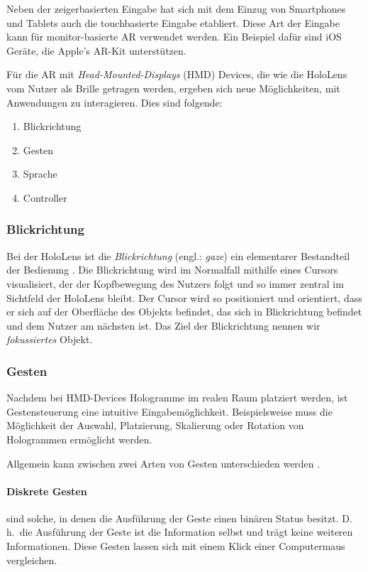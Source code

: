 Neben der zeigerbasierten Eingabe hat sich mit dem Einzug von Smartphones und Tablets auch die touchbasierte Eingabe etabliert. Diese Art der Eingabe kann für monitor-basierte AR verwendet werden. Ein Beispiel dafür sind iOS Geräte, die Apple's AR-Kit unterstützen.

Für die AR mit \textit{Head-Mounted-Displays} (HMD) Devices, die wie die HoloLens vom Nutzer als Brille getragen werden, ergeben sich neue Möglichkeiten, mit Anwendungen zu interagieren. Dies sind folgende:

\begin{enumerate}
  \item Blickrichtung
  \item Gesten
  \item Sprache
  \item Controller
\end{enumerate}

\subsubsection*{Blickrichtung}
Bei der HoloLens ist die \textit{Blickrichtung} (engl.: \textit{gaze}) ein elementarer Bestandteil der Bedienung \cite{windows2017interaction}. Die Blickrichtung wird im Normalfall mithilfe eines Cursors visualisiert, der der Kopfbewegung des Nutzers folgt und so immer zentral im Sichtfeld der HoloLens bleibt. Der Cursor wird so positioniert und orientiert, dass er sich auf der Oberfläche des Objekts befindet, das sich in Blickrichtung befindet und dem Nutzer am nächsten ist. Das Ziel der Blickrichtung nennen wir \textit{fokussiertes} Objekt.

\subsubsection*{Gesten}
Nachdem bei HMD-Devices Hologramme im realen Raum platziert werden, ist Gestensteuerung eine intuitive Eingabemöglichkeit. Beispielsweise muss die Möglichkeit der Auswahl, Platzierung, Skalierung oder Rotation von Hologrammen ermöglicht werden.

Allgemein kann zwischen zwei Arten von Gesten unterschieden werden \cite{windows2017gesture}.

\paragraph{Diskrete Gesten} sind solche, in denen die Ausführung der Geste einen binären Status besitzt. D.\,h.\ die Ausführung der Geste ist die Information selbst und trägt keine weiteren Informationen. Diese Gesten lassen sich mit einem Klick einer Computermaus vergleichen.

